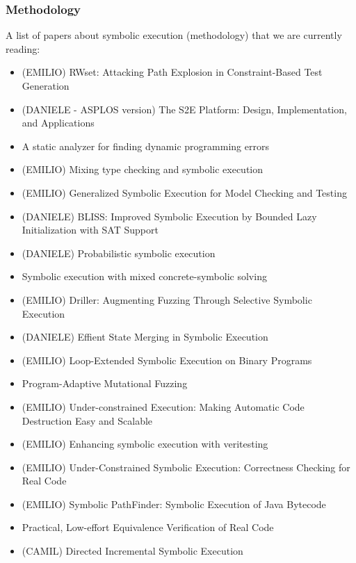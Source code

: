 \documentclass[10pt, a4paper]{article}
\begin{document}
\subsubsection{Methodology}
A list of papers about symbolic execution (methodology) that we are currently reading:
\begin{itemize}
  \item (EMILIO) \cite{BCE-TACAS08} RWset: Attacking Path Explosion in Constraint-Based Test Generation
  \item (DANIELE - ASPLOS version) \cite{CKC-TOCS12} The S2E Platform: Design, Implementation, and Applications
  \item \cite{BPS-SPE00} A static analyzer for finding dynamic programming errors
  \item (EMILIO) \cite{KCF-PLDI10} Mixing type checking and symbolic execution
  \item (EMILIO) \cite{KPV-TACAS03} Generalized Symbolic Execution for Model Checking and Testing
  \item (DANIELE) \cite{BLISS-TSE15} BLISS: Improved Symbolic Execution by Bounded Lazy Initialization with SAT Support
  \item (DANIELE) \cite{GDV-ISSTA12} Probabilistic symbolic execution
  \item \cite{PRV-ISSTA11} Symbolic execution with mixed concrete-symbolic solving
  \item (EMILIO) \cite{DRILLER-NDSS16} Driller: Augmenting Fuzzing Through Selective Symbolic Execution 
  \item (DANIELE) \cite{KKB-PLDI12} Effient State Merging in Symbolic Execution
  \item (EMILIO) \cite{SPM-ISSTA09} Loop-Extended Symbolic Execution on Binary Programs
  \item \cite{CWD-SSP15} Program-Adaptive Mutational Fuzzing
  \item (EMILIO) \cite{ED-ISSTA07} Under-constrained Execution: Making Automatic Code Destruction Easy and Scalable
  \item (EMILIO) \cite{VERITESTING-ICSE14} Enhancing symbolic execution with veritesting
  \item (EMILIO) \cite{UCKLEE-USEC15} Under-Constrained Symbolic Execution: Correctness Checking for Real Code
  \item (EMILIO) \cite{PATHFINDER-ASE10} Symbolic PathFinder: Symbolic Execution of Java Bytecode
  \item \cite{RE-CAV11} Practical, Low-effort Equivalence Verification of Real Code
  \item (CAMIL)\cite{PYR-PLDI11} Directed Incremental Symbolic Execution

\end{itemize}
\end{document}
